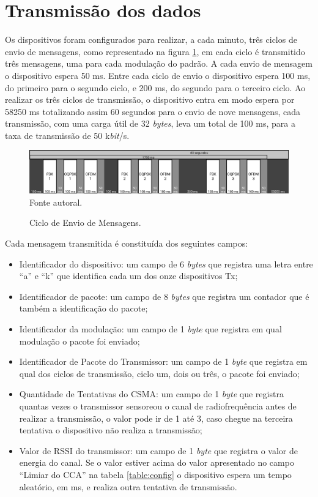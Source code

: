 \section{Transmissão dos dados}
Os dispositivos foram configurados para realizar, a cada minuto, três ciclos de envio de mensagens, como representado na figura \ref{fig:ciclo_envio}, em cada ciclo é transmitido três mensagens, uma para cada modulação do padrão. A cada envio de mensagem o dispositivo espera 50 ms. Entre cada ciclo de envio o dispositivo espera 100 ms, do primeiro para o segundo ciclo, e 200 ms, do segundo para o terceiro ciclo. Ao realizar os três ciclos de transmissão, o dispositivo entra em modo espera por 58250 ms totalizando assim 60 segundos para o envio de nove mensagens, cada transmissão, com uma carga útil de 32 \emph{bytes}, leva um total de 100 ms, para a taxa de transmissão de 50 k\emph{bit}/s.

\begin{figure}[h]
    \centering
    \caption{Ciclo de Envio de Mensagens.}
    \includegraphics[width=\textwidth]{./sections/textual/chapters/images/metodo_ciclo_envio.png}\\
    Fonte autoral.
    \label{fig:ciclo_envio}
\end{figure}

Cada mensagem transmitida é constituída dos seguintes campos:
\begin{itemize}
    \label{table:estruturaTx}
    \item Identificador do dispositivo: um campo de 6 \emph{bytes} que registra uma letra entre ``a'' e ``k'' que identifica cada um dos onze dispositivos Tx;
    \item Identificador de pacote: um campo de 8 \emph{bytes} que registra um contador que é também a identificação do pacote;
    \item Identificador da modulação: um campo de 1 \emph{byte} que registra em qual modulação o pacote foi enviado;
    \item Identificador de Pacote do Transmissor: um campo de 1 \emph{byte} que registra em qual dos ciclos de transmissão, ciclo um, dois ou três, o pacote foi enviado;
    \item Quantidade de Tentativas do CSMA: um campo de 1 \emph{byte} que registra quantas vezes o transmissor sensoreou o canal de radiofrequência antes de realizar a transmissão, o valor pode ir de 1 até 3, caso chegue na terceira tentativa o dispositivo não realiza a transmissão;
    \item Valor de RSSI do transmissor: um campo de 1 \emph{byte} que registra o valor de energia do canal. Se o valor estiver acima do valor apresentado no campo ``Limiar do CCA'' na tabela \ref{table:config} o dispositivo espera um tempo aleatório, em ms, e realiza outra tentativa de transmissão.
\end{itemize}

